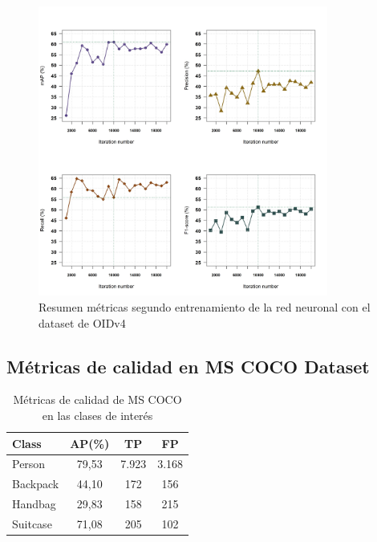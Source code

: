 \begin{figure}[ht]
\centering
\includegraphics[width=0.85\textwidth]{img/chapters/resultados/metricas/metrics-train2.png}
\caption{\label{fig:metrics-train2}Resumen métricas segundo entrenamiento de la red neuronal con el dataset de OIDv4}
\end{figure}

\newpage

\subsection{Métricas de calidad en MS COCO Dataset}
\label{subsec:metricas-calidad-coco}

\begin{table}[ht]
\centering
\caption{Métricas de calidad de MS COCO en las clases de interés}
\label{tab:metricas-clases-coco}
\begin{tabular}{lccc}
\hline
\textbf{Class} & \textbf{AP(\%)} & \textbf{TP} & \textbf{FP} \\ \hline
Person         & 79,53           & 7.923       & 3.168       \\
Backpack       & 44,10           & 172         & 156         \\
Handbag        & 29,83           & 158         & 215         \\
Suitcase       & 71,08           & 205         & 102         \\ \hline
\end{tabular}
\end{table}

